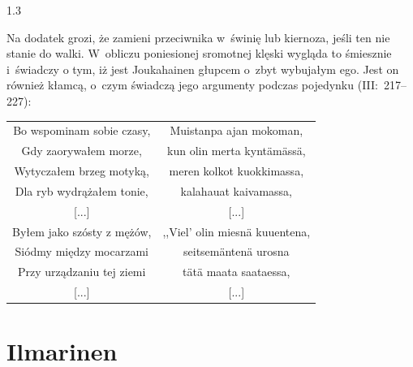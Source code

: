 \documentclass[11pt,a4paper,twoside]{report}
\begin{document}
\begin{spacing}{1.3}

Na dodatek grozi, że zamieni przeciwnika w~świnię lub kiernoza, jeśli ten nie stanie do walki. W~obliczu poniesionej sromotnej klęski wygląda to śmiesznie i~świadczy o tym, iż jest Joukahainen głupcem o~zbyt wybujałym ego. Jest on również kłamcą, o~czym świadczą jego argumenty podczas pojedynku (III:~217--227):
\end{spacing}
\newpage
{\centering
\small
\begin{longtable}{c c}
Bo wspominam sobie czasy, & Muistanpa ajan mokoman, \\
Gdy zaorywałem morze, & kun olin merta kyntämässä,\\
Wytyczałem brzeg motyką, & meren kolkot kuokkimassa,\\
Dla ryb wydrążałem tonie, & kalahauat kaivamassa,\\
{[...]} & {[...]}\\
Byłem jako szósty z mężów, & ,,Viel' olin miesnä kuuentena, \\
Siódmy między mocarzami & seitsemäntenä urosna\\
Przy urządzaniu tej ziemi & tätä maata saataessa,\\
{[...]} & {[...]}\\
\end{longtable}
}


\vspace*{\baselineskip}
\section{Ilmarinen}
\vspace*{0.5\baselineskip}
\end{document}
